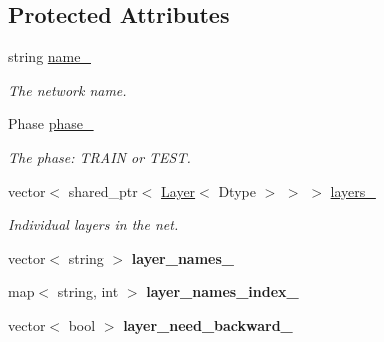 \subsection*{Protected Attributes}
\begin{DoxyCompactItemize}
\item 
string \hyperlink{classcaffe_1_1Net_aef7021f31e355ab8f8991755125f6b2b}{name\+\_\+}\hypertarget{classcaffe_1_1Net_aef7021f31e355ab8f8991755125f6b2b}{}\label{classcaffe_1_1Net_aef7021f31e355ab8f8991755125f6b2b}

\begin{DoxyCompactList}\small\item\em The network name. \end{DoxyCompactList}\item 
Phase \hyperlink{classcaffe_1_1Net_a1fe921a602b4f96602702a13ad605693}{phase\+\_\+}\hypertarget{classcaffe_1_1Net_a1fe921a602b4f96602702a13ad605693}{}\label{classcaffe_1_1Net_a1fe921a602b4f96602702a13ad605693}

\begin{DoxyCompactList}\small\item\em The phase\+: T\+R\+A\+IN or T\+E\+ST. \end{DoxyCompactList}\item 
vector$<$ shared\+\_\+ptr$<$ \hyperlink{classcaffe_1_1Layer}{Layer}$<$ Dtype $>$ $>$ $>$ \hyperlink{classcaffe_1_1Net_ab9e30392aa01dcf182d1a5cbd34ec45e}{layers\+\_\+}\hypertarget{classcaffe_1_1Net_ab9e30392aa01dcf182d1a5cbd34ec45e}{}\label{classcaffe_1_1Net_ab9e30392aa01dcf182d1a5cbd34ec45e}

\begin{DoxyCompactList}\small\item\em Individual layers in the net. \end{DoxyCompactList}\item 
vector$<$ string $>$ {\bfseries layer\+\_\+names\+\_\+}\hypertarget{classcaffe_1_1Net_ac792353f3cac826d97feea4b9eff3dff}{}\label{classcaffe_1_1Net_ac792353f3cac826d97feea4b9eff3dff}

\item 
map$<$ string, int $>$ {\bfseries layer\+\_\+names\+\_\+index\+\_\+}\hypertarget{classcaffe_1_1Net_a41db3e5f1fd7a28c58a2c605a6af0c3b}{}\label{classcaffe_1_1Net_a41db3e5f1fd7a28c58a2c605a6af0c3b}

\item 
vector$<$ bool $>$ {\bfseries layer\+\_\+need\+\_\+backward\+\_\+}\hypertarget{classcaffe_1_1Net_a4c4dbb09376c663637e2444a4fd452b0}{}\label{classcaffe_1_1Net_a4c4dbb09376c663637e2444a4fd452b0}


\end{DoxyCompactItemize}

